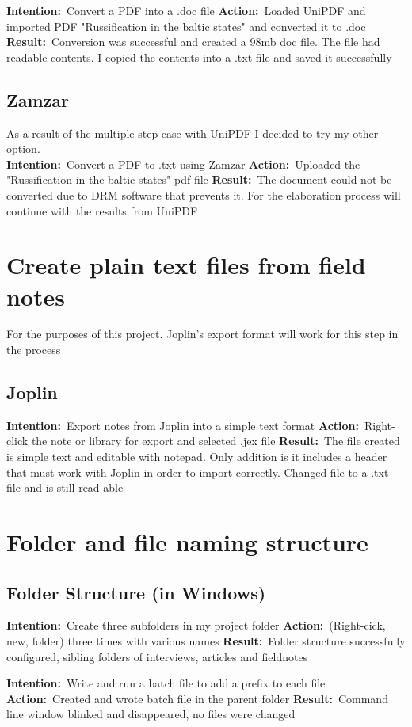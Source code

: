 \documentclass{article}
\newcommand{\intention}[1]{\noindent \textbf{Intention:}{\textnormal\ #1} \newline}
\newcommand{\action}[1]{\textbf{Action:}{\textnormal\ #1} \newline}
\newcommand{\result}[1]{\textbf{Result:}{\textnormal\ #1} \newline}
\begin{document}
\intention{Convert a PDF into a .doc file}
\action{Loaded UniPDF and imported PDF "Russification in the baltic states" and converted it to .doc}
\result{Conversion was successful and created a 98mb doc file. The file had readable contents. I copied the contents into a .txt file and saved it successfully}

\subsection{Zamzar}
As a result of the multiple step case with UniPDF I decided to try my other option.\\
\intention{Convert a PDF to .txt using Zamzar}
\action{Uploaded the "Russification in the baltic states" pdf file}
\result{The document could not be converted due to DRM software that prevents it. For the elaboration process will continue with the results from UniPDF}


\section{Create plain text files from field notes}
For the purposes of this project. Joplin's export format will work for this step in the process
\subsection{Joplin}
\intention{Export notes from Joplin into a simple text format}
\action{Right-click the note or library for export and selected .jex file}
\result{The file created is simple text and editable with notepad. Only addition is it includes a header that must work with Joplin in order to import correctly. Changed file to a .txt file and is still read-able}

\section{Folder and file naming structure}
\subsection{Folder Structure (in Windows)}
\intention{Create three subfolders in my project folder}
\action{(Right-cick, new, folder) three times with various names}
\result{Folder structure successfully configured, sibling folders of interviews, articles and fieldnotes}

\intention{Write and run a batch file to add a prefix to each file}
\action{Created and wrote batch file in the parent folder}
\result{Command line window blinked and disappeared, no files were changed}
\end{document}

